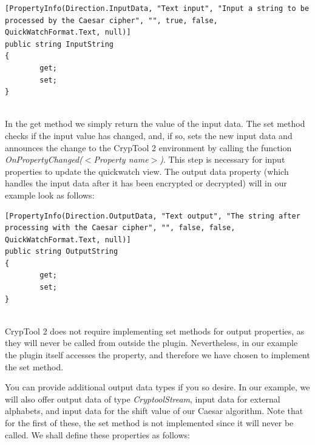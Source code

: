 \begin{lstlisting}
[PropertyInfo(Direction.InputData, "Text input", "Input a string to be processed by the Caesar cipher", "", true, false, QuickWatchFormat.Text, null)]
public string InputString
{
		get;
		set;
}
\end{lstlisting}

\ \\
In the get method we simply return the value of the input data. The set method checks if the input value has changed, and, if so, sets the new input data and announces the change to the CrypTool 2 environment by calling the function \textit{OnPropertyChanged(\textit{$<$Property name$>$})}. This step is necessary for input properties to update the quickwatch view. The output data property (which handles the input data after it has been encrypted or decrypted) will in our example look as follows:


\begin{lstlisting}
[PropertyInfo(Direction.OutputData, "Text output", "The string after processing with the Caesar cipher", "", false, false, QuickWatchFormat.Text, null)]
public string OutputString
{
		get;
		set;
}
\end{lstlisting}

\ \\
\indent CrypTool 2 does not require implementing set methods for output properties, as they will never be called from outside the plugin. Nevertheless, in our example the plugin itself accesses the property, and therefore we have chosen to implement the set method.

You can provide additional output data types if you so desire. In our example, we will also offer output data of type \textit{CryptoolStream}, input data for external alphabets, and input data for the shift value of our Caesar algorithm. Note that for the first of these, the set method is not implemented since it will never be called. We shall define these properties as follows:

